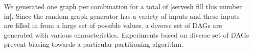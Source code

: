 We generated one graph per combination for a total of [servesh fill this number
in]. Since the random graph generator has a variety of inputs and these inputs
are filled in from a large set of possible values, a diverse set of DAGs are
generated with various characteristics. Experiments based on diverse set of DAGs
prevent biasing towards a particular partitioning algorithm.





